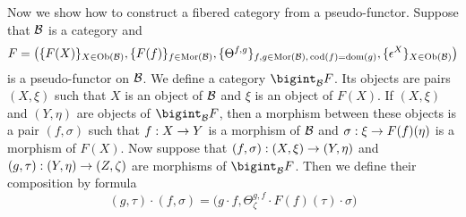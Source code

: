 \noindent
Now we show how to construct a fibered category from a pseudo-functor. Suppose that ${\mathcal B}$ is a category and
$$F = \big(\{F(X)\}_{X\in \mathrm{Ob}({\mathcal B})},\{F(f)\}_{f\in \mathrm{Mor}({\mathcal B})},\{\Theta^{f,g}\}_{f,g\in \mathrm{Mor}({\mathcal B}),\,\mathrm{cod}(f)=\mathrm{dom}(g)},\{\epsilon^X\}_{X\in \mathrm{Ob}({\mathcal B})}\big)$$
is a pseudo-functor on ${\mathcal B}$. We define a category $\bigint_{\cB}F$. Its objects are pairs $(X,\xi)$ such that $X$ is an object of ${\mathcal B}$ and $\xi$ is an object of $F(X)$. If $(X,\xi)$ and $(Y,\eta)$ are objects of $\bigint_{\cB}F$, then a morphism between these objects is a pair $(f,\sigma)$ such that $f:X\rightarrow Y$ is a morphism of ${\mathcal B}$ and $\sigma:\xi\rightarrow F(f)(\eta)$ is a morphism of $F(X)$. Now suppose that $(f,\sigma):(X,\xi)\rightarrow (Y,\eta)$ and $(g,\tau):(Y,\eta)\rightarrow (Z,\zeta)$ are morphisms of $\bigint_{\cB}F$. Then we define their composition by formula
$$(g,\tau)\cdot (f,\sigma) = \big(g\cdot f, \Theta^{g,f}_{\zeta}\cdot F(f)\left(\tau\right)\cdot \sigma\big)$$

